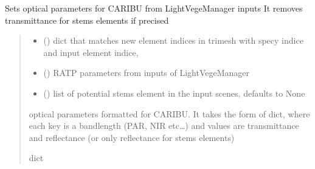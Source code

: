 \documentclass[letterpaper,10pt,english]{sphinxmanual}
\begin{document}
\begin{fulllineitems}
\label{\detokenize{reference:CARIBUinputs.CARIBU_opticals}}
\pysigstartsignatures
{}
\pysigstopsignatures
\sphinxAtStartPar
Sets optical parameters for CARIBU from LightVegeManager inputs
It removes transmittance for stems elements if precised
\begin{quote}\begin{description}
\begin{itemize}
\item {} 
\sphinxAtStartPar
{} () \textendash{} dict that matches new element indices in trimesh with specy indice and
input element indice, 

\item {} 
\sphinxAtStartPar
{} () \textendash{} RATP parameters from inputs of LightVegeManager

\item {} 
\sphinxAtStartPar
{} (\sphinxstyleliteralemphasis{\sphinxupquote{, }}) \textendash{} list of potential stems element in the input scenes, defaults to None

\end{itemize}

\sphinxAtStartPar
optical parameters formatted for CARIBU. It takes the form of dict, where each 
key is a bandlength (PAR, NIR etc…) and values are transmittance and reflectance
(or only reflectance for stems elements)

\sphinxAtStartPar
dict

\end{description}\end{quote}

\end{fulllineitems}
\end{document}
